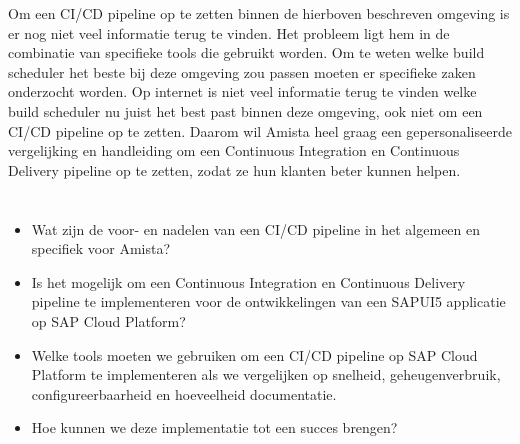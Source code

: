 Om een CI/CD pipeline op te zetten binnen de hierboven beschreven omgeving is er nog niet veel informatie terug te vinden. Het probleem ligt hem in de combinatie van specifieke tools die gebruikt worden. Om te weten welke build scheduler het beste bij deze omgeving zou passen moeten er specifieke zaken onderzocht worden. Op internet is niet veel informatie terug te vinden welke build scheduler nu juist het best past binnen deze omgeving, ook niet om een CI/CD pipeline op te zetten. Daarom wil Amista heel graag een gepersonaliseerde vergelijking en handleiding om een Continuous Integration en Continuous Delivery pipeline op te zetten, zodat ze hun klanten beter kunnen helpen.


\section{}
\label{sec:onderzoeksvraag}

\begin{itemize}
    \item Wat zijn de voor- en nadelen van een CI/CD pipeline in het algemeen en specifiek voor Amista?
    \item Is het mogelijk om een Continuous Integration en Continuous Delivery pipeline te implementeren voor de ontwikkelingen van een SAPUI5 applicatie op SAP Cloud Platform?
    \item Welke tools moeten we gebruiken om een CI/CD pipeline op SAP Cloud Platform te implementeren als we vergelijken op snelheid, geheugenverbruik, configureerbaarheid en hoeveelheid documentatie.
    \item Hoe kunnen we deze implementatie tot een succes brengen?
    
\end{itemize}

